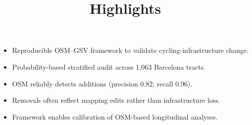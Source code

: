 \documentclass[
]{article}
\title{Highlights}
\author{}
\date{}
\begin{document}
\maketitle


\begin{itemize}
\item
  Reproducible OSM--GSV framework to validate cycling-infrastructure
  change.
\item
  Probability-based stratified audit across 1,063 Barcelona tracts.
\item
  OSM reliably detects additions (precision 0.82; recall 0.96).
\item
  Removals often reflect mapping edits rather than infrastructure loss.
\item
  Framework enables calibration of OSM-based longitudinal analyses.
\end{itemize}
\end{document}
